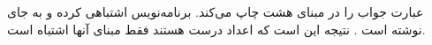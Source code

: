 \section{}
\paragraph{}\label{answer:53}
عبارت  جواب را در مبنای هشت چاپ می‌کند. برنامه‌نویس اشتباهی کرده و به جای  نوشته است . نتیجه این است که اعداد درست هستند فقط مبنای آنها اشتباه است.